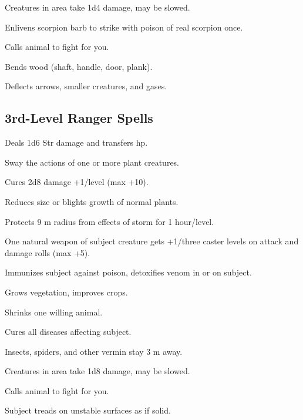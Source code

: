  Creatures in area take 1d4 damage, may be slowed.

 Enlivens scorpion barb to strike with poison of real scorpion once. %

 Calls animal to fight for you.

 Bends wood (shaft, handle, door, plank).

 Deflects arrows, smaller creatures, and gases.



\subsection{3rd-Level Ranger Spells}


 Deals 1d6 Str damage and transfers hp. %

 Sway the actions of one or more plant creatures.

 Cures 2d8 damage +1/level (max +10).

 Reduces size or blights growth of normal plants.

 Protects 9 m radius from effects of storm for 1 hour/level. %

 One natural weapon of subject creature gets +1/three caster levels on attack and damage rolls (max +5).

 Immunizes subject against poison, detoxifies venom in or on subject.

 Grows vegetation, improves crops.

 Shrinks one willing animal.

 Cures all diseases affecting subject.

 Insects, spiders, and other vermin stay 3 m away.

 Creatures in area take 1d8 damage, may be slowed.

 Calls animal to fight for you.

 Subject treads on unstable surfaces as if solid. %

